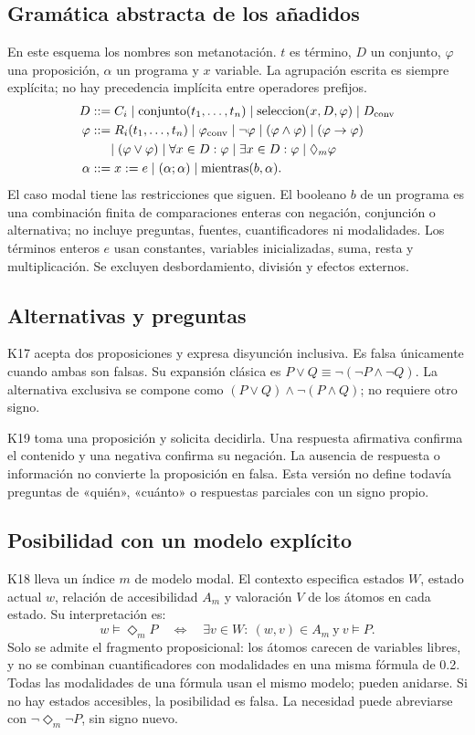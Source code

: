 \subsection{Gramática abstracta de los añadidos}
En este esquema los nombres son metanotación. \(t\) es término, \(D\) un
conjunto, \(\varphi\) una proposición, \(\alpha\) un programa y \(x\) variable.
La agrupación escrita es siempre explícita; no hay precedencia implícita entre
operadores prefijos.
\begin{align*}
D &::= C_i\mid\operatorname{conjunto}(t_1,\ldots,t_n)
       \mid\operatorname{seleccion}(x,D,\varphi)\mid D_{\rm conv}\\
\varphi &::= R_i(t_1,\ldots,t_n)\mid\varphi_{\rm conv}
       \mid\neg\varphi\mid(\varphi\land\varphi)\mid(\varphi\to\varphi)\\
 &\phantom{::=}\mid(\varphi\lor\varphi)\mid\forall x\in D:\varphi
       \mid\exists x\in D:\varphi\mid\Diamond_m\varphi\\
\alpha &::= x:=e\mid(\alpha;\alpha)\mid\operatorname{mientras}(b,\alpha).
\end{align*}
El caso modal tiene las restricciones que siguen. El booleano \(b\) de un programa
es una combinación finita de comparaciones enteras con negación, conjunción o
alternativa; no incluye preguntas, fuentes, cuantificadores ni modalidades.
Los términos enteros \(e\) usan constantes, variables inicializadas, suma, resta
y multiplicación. Se excluyen desbordamiento, división y efectos externos.

\subsection{Alternativas y preguntas}
K17 acepta dos proposiciones y expresa disyunción inclusiva. Es falsa únicamente
cuando ambas son falsas. Su expansión clásica es
\(P\lor Q\equiv\neg(\neg P\land\neg Q)\).
La alternativa exclusiva se compone como
\((P\lor Q)\land\neg(P\land Q)\); no requiere otro signo.

K19 toma una proposición y solicita decidirla. Una respuesta afirmativa confirma
el contenido y una negativa confirma su negación. La ausencia de respuesta o
información no convierte la proposición en falsa. Esta versión no define todavía
preguntas de «quién», «cuánto» o respuestas parciales con un signo propio.

\subsection{Posibilidad con un modelo explícito}
K18 lleva un índice \(m\) de modelo modal. El contexto especifica estados \(W\),
estado actual \(w\), relación de accesibilidad \(A_m\) y valoración \(V\) de los
átomos en cada estado. Su interpretación es:
\[
 w\models\Diamond_m P
 \quad\Longleftrightarrow\quad
 \exists v\in W:\ (w,v)\in A_m\ \text{y}\ v\models P.
\]
Solo se admite el fragmento proposicional: los átomos carecen de variables libres,
y no se combinan cuantificadores con modalidades en una misma fórmula de 0.2.
Todas las modalidades de una fórmula usan el mismo modelo; pueden anidarse.
Si no hay estados accesibles, la posibilidad es falsa. La necesidad puede
abreviarse con \(\neg\Diamond_m\neg P\), sin signo nuevo.

